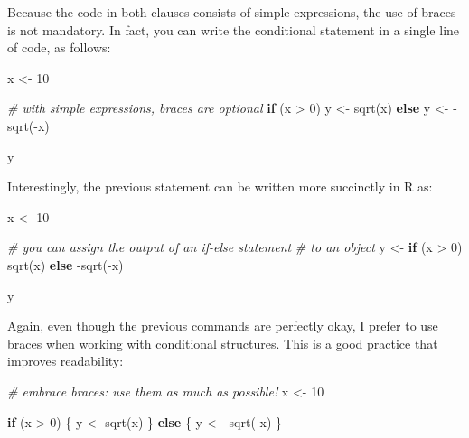 \documentclass[
]{book}
\newenvironment{Shaded}{\begin{snugshade}}{\end{snugshade}}
\newcommand{\CommentTok}[1]{\textcolor[rgb]{0.56,0.35,0.01}{\textit{#1}}}
\newcommand{\ControlFlowTok}[1]{\textcolor[rgb]{0.13,0.29,0.53}{\textbf{#1}}}
\newcommand{\DecValTok}[1]{\textcolor[rgb]{0.00,0.00,0.81}{#1}}
\newcommand{\FunctionTok}[1]{\textcolor[rgb]{0.00,0.00,0.00}{#1}}
\newcommand{\NormalTok}[1]{#1}
\newcommand{\OtherTok}[1]{\textcolor[rgb]{0.56,0.35,0.01}{#1}}
\newcommand{\SpecialCharTok}[1]{\textcolor[rgb]{0.00,0.00,0.00}{#1}}
\begin{document}
Because the code in both clauses consists of simple expressions, the use of
braces is not mandatory. In fact, you can write the conditional statement in
a single line of code, as follows:

\begin{Shaded}
\begin{Highlighting}[]
\NormalTok{x }\OtherTok{\textless{}{-}} \DecValTok{10}

\CommentTok{\# with simple expressions, braces are optional}
\ControlFlowTok{if}\NormalTok{ (x }\SpecialCharTok{\textgreater{}} \DecValTok{0}\NormalTok{) y }\OtherTok{\textless{}{-}} \FunctionTok{sqrt}\NormalTok{(x) }\ControlFlowTok{else}\NormalTok{ y }\OtherTok{\textless{}{-}} \SpecialCharTok{{-}}\FunctionTok{sqrt}\NormalTok{(}\SpecialCharTok{{-}}\NormalTok{x)}

\NormalTok{y}
\end{Highlighting}
\end{Shaded}

Interestingly, the previous statement can be written more succinctly in R as:

\begin{Shaded}
\begin{Highlighting}[]
\NormalTok{x }\OtherTok{\textless{}{-}} \DecValTok{10}

\CommentTok{\# you can assign the output of an if{-}else statement}
\CommentTok{\# to an object}
\NormalTok{y }\OtherTok{\textless{}{-}} \ControlFlowTok{if}\NormalTok{ (x }\SpecialCharTok{\textgreater{}} \DecValTok{0}\NormalTok{) }\FunctionTok{sqrt}\NormalTok{(x) }\ControlFlowTok{else} \SpecialCharTok{{-}}\FunctionTok{sqrt}\NormalTok{(}\SpecialCharTok{{-}}\NormalTok{x)}

\NormalTok{y}
\end{Highlighting}
\end{Shaded}

Again, even though the previous commands are perfectly okay, I prefer to
use braces when working with conditional structures. This is a good practice
that improves readability:

\begin{Shaded}
\begin{Highlighting}[]
\CommentTok{\# embrace braces: use them as much as possible!}
\NormalTok{x }\OtherTok{\textless{}{-}} \DecValTok{10}

\ControlFlowTok{if}\NormalTok{ (x }\SpecialCharTok{\textgreater{}} \DecValTok{0}\NormalTok{) \{}
\NormalTok{  y }\OtherTok{\textless{}{-}} \FunctionTok{sqrt}\NormalTok{(x) }
\NormalTok{\} }\ControlFlowTok{else}\NormalTok{ \{}
\NormalTok{  y }\OtherTok{\textless{}{-}} \SpecialCharTok{{-}}\FunctionTok{sqrt}\NormalTok{(}\SpecialCharTok{{-}}\NormalTok{x)}
\NormalTok{\}}
\end{Highlighting}
\end{Shaded}
\end{document}
